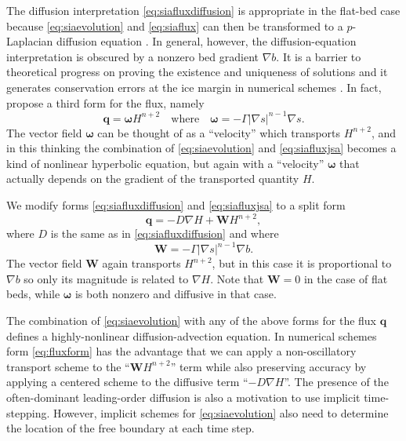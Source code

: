 \documentclass[twocolumn,letterpaper]{igs}
\newcommand\bq{\mathbf{q}}
\newcommand\bW{\mathbf{W}}
\newcommand{\grad}{\nabla}
\begin{document}
The diffusion interpretation \eqref{eq:siafluxdiffusion} is appropriate in the flat-bed case because \eqref{eq:siaevolution} and \eqref{eq:siaflux} can then be transformed to a $p$-Laplacian diffusion equation \citep{Calvoetal2002}.  In general, however, the diffusion-equation interpretation is obscured by a nonzero bed gradient $\grad b$.  It is a barrier to theoretical progress on proving the existence and uniqueness of solutions \citep{JouvetBueler2012} and it generates conservation errors at the ice margin in numerical schemes \citep{JaroschSchoofAnslow2013}.  In fact, \cite{JaroschSchoofAnslow2013} propose a third form for the flux, namely
\begin{equation}
   \bq = \boldsymbol{\omega} H^{n+2} \quad \text{where} \quad \boldsymbol{\omega} = - \Gamma |\grad s|^{n-1} \grad s. \label{eq:siafluxjsa}
\end{equation}
The vector field $\boldsymbol{\omega}$ can be thought of as a ``velocity'' which transports $H^{n+2}$, and in this thinking the combination of \eqref{eq:siaevolution} and \eqref{eq:siafluxjsa} becomes a kind of nonlinear hyperbolic equation, but again with a ``velocity'' $\boldsymbol{\omega}$ that actually depends on the gradient of the transported quantity $H$.

We modify forms \eqref{eq:siafluxdiffusion} and \eqref{eq:siafluxjsa} to a split form
\begin{equation}
\bq = - D \grad H + \bW H^{n+2},\label{eq:fluxform}
\end{equation}
where $D$ is the same as in \eqref{eq:siafluxdiffusion} and where
\begin{equation}
\bW = - \Gamma |\grad s|^{n-1} \grad b.  \label{eq:siaWdefine}
\end{equation}
The vector field $\bW$ again transports $H^{n+2}$, but in this case it is proportional to $\grad b$ so only its magnitude is related to $\grad H$.  Note that $\bW=0$ in the case of flat beds, while $\boldsymbol{\omega}$ is both nonzero and diffusive in that case.

The combination of \eqref{eq:siaevolution} with any of the above forms for the flux $\bq$ defines a highly-nonlinear diffusion-advection equation.  In numerical schemes form \eqref{eq:fluxform} has the advantage that we can apply a non-oscillatory transport scheme to the ``$\bW H^{n+2}$'' term while also preserving accuracy by applying a centered scheme to the diffusive term ``$-D \grad H$''.  The presence of the often-dominant leading-order diffusion is also a motivation to use implicit time-stepping.  However, implicit schemes for \eqref{eq:siaevolution} also need to determine the location of the free boundary at each time step.
\end{document}
